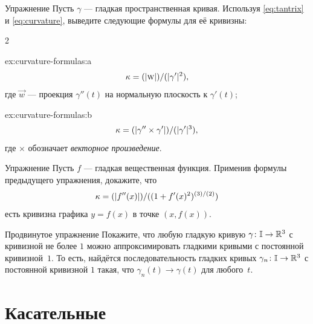 \begin{thm}{Упражнение}\label{ex:curvature-formulas}
Пусть $\gamma$ --- гладкая пространственная кривая.
Используя \ref{eq:tantrix} и \ref{eq:curvature}, выведите следующие формулы для её кривизны:
\setlength{\columnseprule}{0.4pt}
\begin{multicols}{2}

\begin{subthm}{ex:curvature-formulas:a} 
\[\kappa=(|\text{\sc{w}}|)/(|\gamma'|^2),\]
где $\vec w$ --- проекция $\gamma''(t)$ на нормальную плоскость к $\gamma'(t)$;
\end{subthm}

\columnbreak

\begin{subthm}{ex:curvature-formulas:b}
\[\kappa=(|\gamma''\times \gamma'|)/(|\gamma'|^{3}),\]
где $\times$ обозначает \emph{векторное произведение}.
\end{subthm}

\vfill\null
\end{multicols}
\end{thm}

{\sloppy

\begin{thm}{Упражнение}\label{ex:curvature-graph}
Пусть $f$ --- гладкая вещественная функция.
Применив формулы предыдущего упражнения, докажите, что 
\[\kappa=(|f''(x)|)/((1+f'(x)^2)^{(3)/(2)})\]
есть кривизна графика $y=f(x)$ в точке $(x,f(x))$. 
\end{thm}

}

\begin{thm}{Продвинутое упражнение}\label{ex:approximation-const-curvature}
Покажите, что любую гладкую кривую $\gamma\:\mathbb{I}\z\to\mathbb{R}^3$ с кривизной не более $1$ можно аппроксимировать гладкими кривыми с постоянной кривизной~$1$.
То есть, найдётся последовательность гладких кривых $\gamma_n\:\mathbb{I}\z\to\mathbb{R}^3$ с постоянной кривизной $1$ такая, что $\gamma_n(t)\to \gamma(t)$ для любого~$t$.
\end{thm}


\section{Касательные}

